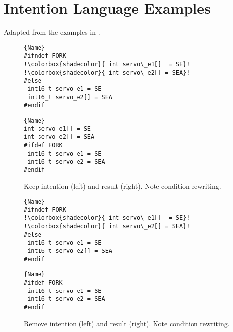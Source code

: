 \chapter{Intention Language Examples}\label{a:intentions}
Adapted from the examples in \cite{lillack2017intentions}.

\begin{figure}[ht]
    \centering
    \begin{minipage}{.35\textwidth}
\begin{lstlisting}[caption=Wrapped code by PC,escapechar=!]{Name}
#ifndef FORK
!\colorbox{shadecolor}{ int servo\_e1[]  = SE}!
!\colorbox{shadecolor}{ int servo\_e2[] = SEA}!
#else
 int16_t servo_e1 = SE
 int16_t servo_e2[] = SEA
#endif
\end{lstlisting}
\end{minipage}\qquad
\begin{minipage}{.35\textwidth}
\begin{lstlisting}[caption=Unwrapped code,escapechar=!]{Name}
int servo_e1[] = SE
int servo_e2[] = SEA
#ifdef FORK
 int16_t servo_e1 = SE
 int16_t servo_e2 = SEA
#endif
\end{lstlisting}
    \end{minipage}
    \caption{Keep intention (left) and result (right). Note condition rewriting.}
    \label{fig:keep}
\end{figure}

\begin{figure}[ht]
    \centering
    \begin{minipage}{.35\textwidth}
\begin{lstlisting}[caption=Wrapped code by PC,escapechar=!]{Name}
#ifndef FORK
!\colorbox{shadecolor}{ int servo\_e1[]  = SE}!
!\colorbox{shadecolor}{ int servo\_e2[] = SEA}!
#else
 int16_t servo_e1 = SE
 int16_t servo_e2[] = SEA
#endif
\end{lstlisting}
\end{minipage}\qquad
\begin{minipage}{.35\textwidth}
\begin{lstlisting}[caption=Unwrapped code,escapechar=!]{Name}
#ifdef FORK
 int16_t servo_e1 = SE
 int16_t servo_e2 = SEA
#endif
\end{lstlisting}
    \end{minipage}
    \caption{Remove intention (left) and result (right). Note condition rewriting.}
    \label{fig:remove}
\end{figure}

